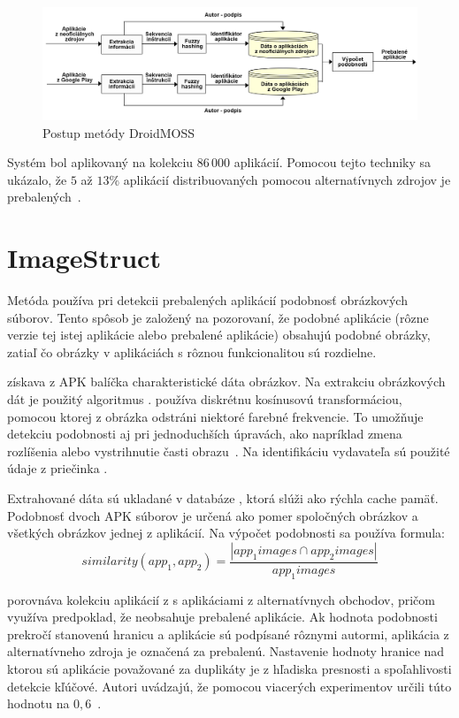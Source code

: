 \begin{figure}[htb]
  \begin{center}
    \includegraphics[width=130mm]{images/DroidMoss.png}
  \end{center}
  \caption{Postup metódy DroidMOSS}
  \label{fig:strukturaDroidMoss}
\end{figure}


Systém  bol aplikovaný na kolekciu $86\,000$ aplikácií. Pomocou tejto techniky sa ukázalo, že $5$ až $13\%$  aplikácií distribuovaných pomocou alternatívnych zdrojov je prebalených~\cite{DetectingRepackagedZhou}.


\section{ImageStruct}
Metóda  používa pri detekcii prebalených aplikácií podobnosť obrázkových súborov. Tento spôsob je založený na pozorovaní, že podobné aplikácie (rôzne verzie tej istej aplikácie alebo prebalené aplikácie) obsahujú podobné obrázky, zatiaľ čo obrázky v aplikáciách s rôznou funkcionalitou sú rozdielne. 


 získava z APK balíčka charakteristické dáta obrázkov. Na extrakciu obrázkových dát je použitý algoritmus .  používa diskrétnu kosínusovú transformáciou, pomocou ktorej z obrázka odstráni niektoré farebné frekvencie. To umožňuje detekciu podobnosti aj pri jednoduchších úpravách, ako napríklad zmena rozlíšenia alebo vystrihnutie časti obrazu~\cite{pHash}. Na identifikáciu vydavateľa sú použité údaje z priečinka .


Extrahované dáta sú ukladané v databáze , ktorá slúži ako rýchla cache pamäť. 
Podobnosť dvoch APK súborov je určená ako pomer spoločných obrázkov a všetkých obrázkov jednej z aplikácií. Na výpočet podobnosti sa používa formula:
\[ similarity(app_1, app_2) = \frac{|app_{1}images \cap app_{2}images|} { app_{1}images} \]


  porovnáva kolekciu aplikácií z  s aplikáciami z alternatívnych obchodov, pričom využíva predpoklad, že  neobsahuje prebalené aplikácie. Ak hodnota podobnosti prekročí stanovenú hranicu a aplikácie sú podpísané rôznymi autormi, aplikácia z alternatívneho zdroja je označená za prebalenú.
Nastavenie hodnoty hranice nad ktorou sú aplikácie považované za duplikáty je z hľadiska presnosti a spoľahlivosti detekcie kľúčové. Autori uvádzajú, že pomocou viacerých experimentov určili túto hodnotu na $0,6$~\cite{ImageStruct}.

